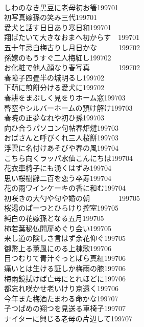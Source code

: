 \begin{multicols}{2}
\\しわのなき黒豆に老母初お箸\hfill{199701}
\\初写真嫁孫の笑み三代\hfill{199701}
\\愛犬と話す日日あり寒日和\hfill{199701}
\\翔ばたいて大きなおまへ初からす　\hfill{199701　}
\\五十年忌白梅古りし月日かな　　　\hfill{199702　}
\\孫嫁のもうすぐ二人梅紅し\hfill{199702}
\\お化粧で他人顔なり春写真　　　　\hfill{199702　}
\\春障子四畳半の城明るし\hfill{199702}
\\下萌に煎餅分ける愛犬に\hfill{199702}
\\春耕をまぶしく見をりホーム窓\hfill{199703}
\\啓窒やシルバーホームの預け解け\hfill{199703}
\\春暁の正夢なれや初ひ孫\hfill{199703}
\\向ひ合うパソコン句帖春炬燵\hfill{199703　}
\\おばさんと呼びくれ三人桜餅\hfill{199703}
\\浮雲に名付けあそびや春の風\hfill{199704}
\\こちら向くラッパ水仙こんにちは\hfill{199704}
\\花衣車椅子にも湧くはずみ\hfill{199704}
\\思い桜樹齢二百を恋う卒寿\hfill{199704}
\\花の雨ワインケーキの香に和む\hfill{199704}
\\初咲きの大勺や句や婚の朝　　　　\hfill{199705}
\\桜湯のぱーつとひらけり控室\hfill{199705}
\\純白の花嫁孫となる五月\hfill{199705}
\\柿若葉秘仏開扉めぐり会い\hfill{199705}
\\来し道の険しさ言はず余花仰ぐ\hfill{199705}
\\御幣上る薫風にのる上棟歌\hfill{199706}
\\目つむりて青汁ぐっとばら真紅\hfill{199706}
\\痛いとは生ける証しか梅雨の膝\hfill{199706}
\\梅雨鏡拭けば亡母にとれほどに\hfill{199706}
\\都忘れ咲かせ老いけり京遠く\hfill{199706}
\\今年また梅酒たまわる命かな\hfill{199707}
\\子つばめの翔つを見送る車椅子\hfill{199707}
\\ナイターに興じる老母の片辺して\hfill{199707}

\end{multicols}
